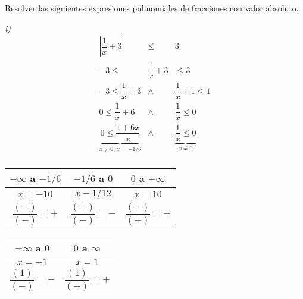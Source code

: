 \begin{myexample}
Resolver las siguientes expresiones polinomiales de fracciones con valor absoluto.
\end{myexample}

\noindent\textit{i)}
	\begin{eqnarray*}
\left|\dfrac{1}{x}+3 \right| &\leq &3 \\
-3\leq &\dfrac{1}{x}+3& \leq 3 \\
-3\leq \dfrac{1}{x}+3 &\wedge &\dfrac{1}{x}+1 \leq 1 \\
0\leq \dfrac{1}{x}+6 &\wedge &\dfrac{1}{x} \leq 0\\
\underbrace{0\leq \dfrac{1+6x}{x}}_\text{$x\neq 0$,  $x=-1/6$} &\wedge &\underbrace{\dfrac{1}{x}\leq 0}_\text{$x\neq 0$}\\
	\end{eqnarray*}

\begin{minipage}{0.5\textwidth}
	\begin{tabular}{|c|c|c|}
\hline
  $-\infty$ a $-1/6$ & $-1/6$ a $0$ & $0$ a $+\infty$ \\
\hline
 $x=-10$ & $x-1/12$ & $x=10$  \\
  $\dfrac{(-)}{(-)}=+$&$\dfrac{(+)}{(-)}=-$&$\dfrac{(+)}{(+)}=+$  \\
\hline
	\end{tabular}
\end{minipage}
\begin{minipage}{0.5\textwidth}
	\begin{tabular}{|c|c|}
\hline
 $-\infty$ a $0$ & $0$ a $\infty$    \\
\hline
 $x=-1$&$x=1$   \\
  $\dfrac{(1)}{(-)}=-$& $\dfrac{(1)}{(+)}=+$  \\
  \hline
	\end{tabular}
\end{minipage}

